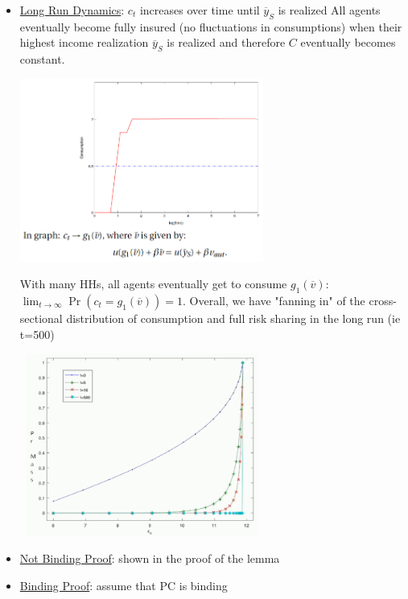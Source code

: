 \documentclass{article}
\begin{document}
\begin{itemize}
\begin{itemize}
\begin{center}
            \end{center}
        \item \underline{Long Run Dynamics}: $c_{t}$ increases over time until $\overline{y}_{S}$ is realized
            All agents eventually become fully insured (no fluctuations in consumptions) when their highest income realization $\overline{y}_{S}$ is realized and therefore $C$ eventually becomes constant.
            \newline
            \begin{center}
            \includegraphics[width=8cm, height=6cm]{pic13}
            \end{center}
            With many HHs, all agents eventually get to consume $g_{1}(\overline{v})$: $\lim_{t \rightarrow \infty} \Pr(c_{t} = g_{1}(\overline{v})) = 1$. Overall, we have "fanning in" of the cross-sectional distribution of consumption and full risk sharing in the long run (ie t=500)
            \newline
            \begin{center}
            \includegraphics[width=8cm, height=6cm]{pic14}
            \end{center}
        \item  \underline{Not Binding Proof}: shown in the proof of the lemma
        \item  \underline{Binding Proof}: assume that PC is binding

\end{itemize}
\end{itemize}
\end{document}

